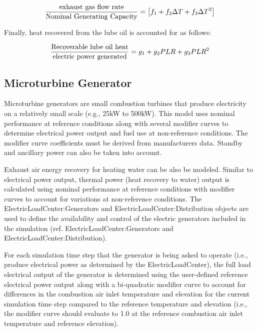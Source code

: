 \begin{equation}
\frac{{{\rm{exhaust~gas~flow~rate}}}}{{{\rm{Nominal~Generating~Capacity}}}} = \left[ {{f_1} + {f_2}\Delta T + {f_3}\Delta {T^2}} \right]
\end{equation}

Finally, heat recovered from the lube oil is accounted for as follows:

\begin{equation}
\frac{{{\rm{Recoverable~lube~oil~heat}}}}{{{\rm{electric~power~generated}}}} = {g_1} + {g_2}PLR + {g_3}PL{R^2}
\end{equation}

\subsection{Microturbine Generator}\label{microturbine-generator}

Microturbine generators are small combustion turbines that produce electricity on a relatively small scale (e.g., 25kW to 500kW). This model uses nominal performance at reference conditions along with several modifier curves to determine electrical power output and fuel use at non-reference conditions. The modifier curve coefficients must be derived from manufacturers data. Standby and ancillary power can also be taken into account.

Exhaust air energy recovery for heating water can be also be modeled. Similar to electrical power output, thermal power (heat recovery to water) output is calculated using nominal performance at reference conditions with modifier curves to account for variations at non-reference conditions. The ElectricLoadCenter:Generators and ElectricLoadCenter:Distribution objects are used to define the availability and control of the electric generators included in the simulation (ref. ElectricLoadCenter:Generators and ElectricLoadCenter:Distribution).

For each simulation time step that the generator is being asked to operate (i.e., produce electrical power as determined by the ElectricLoadCenter), the full load electrical output of the generator is determined using the user-defined reference electrical power output along with a bi-quadratic modifier curve to account for differences in the combustion air inlet temperature and elevation for the current simulation time step compared to the reference temperature and elevation (i.e., the modifier curve should evaluate to 1.0 at the reference combustion air inlet temperature and reference elevation).

